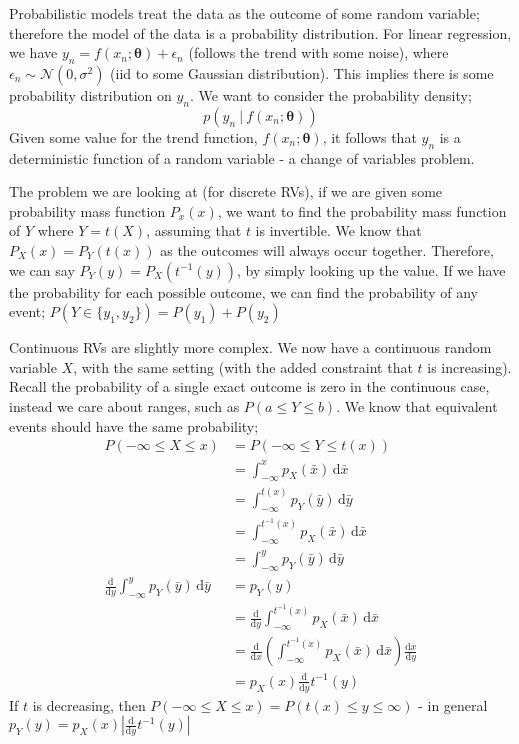 \documentclass[a4paper, 12pt]{article}
\newcommand{\defint}[4]{\int_{#1}^{#2} #3 \, \mathrm{d}#4}
\newcommand{\dif}[2]{\frac{\mathrm{d}#1}{\mathrm{d}#2}}
\renewcommand{\vec}[1]{\boldsymbol{#1}}
\begin{document}
            Probabilistic models treat the data as the outcome of some random variable; therefore the model of the data is a probability distribution.
            For linear regression, we have $y_n = f(x_n; \vec{\theta}) + \epsilon_n$ (follows the trend with some noise), where $\epsilon_n \sim \mathcal{N}(0, \sigma^2)$ (iid to some Gaussian distribution).
            This implies there is some probability distribution on $y_n$.
            We want to consider the probability density;
            $$p(y_n\ |\ f(x_n; \vec{\theta}))$$
            Given some value for the trend function, $f(x_n; \vec{\theta})$, it follows that $y_n$ is a deterministic function of a random variable - a change of variables problem.
            \medskip

            The problem we are looking at (for discrete RVs), if we are given some probability mass function $P_x(x)$, we want to find the probability mass function of $Y$ where $Y = t(X)$, assuming that $t$ is invertible.
            We know that $P_X(x) = P_Y(t(x))$ as the outcomes will always occur together.
            Therefore, we can say $P_Y(y) = P_X(t^{-1}(y))$, by simply looking up the value.
            If we have the probability for each possible outcome, we can find the probability of any event; $P(Y \in \{ y_1, y_2 \}) = P(y_1) + P(y_2)$
            \medskip

            Continuous RVs are slightly more complex.
            We now have a continuous random variable $X$, with the same setting (with the added constraint that $t$ is increasing).
            Recall the probability of a single exact outcome is zero in the continuous case, instead we care about ranges, such as $P(a \leq Y \leq b)$.
            We know that equivalent events should have the same probability;
            \begin{align*}
                P(-\infty \leq X \leq x) & = P(-\infty \leq Y \leq t(x)) \\
                & = \defint{-\infty}{x}{p_X(\bar{x})}{\bar{x}} \\
                & = \defint{-\infty}{t(x)}{p_Y(\bar{y})}{\bar{y}} \\
                & = \defint{-\infty}{t^{-1}(x)}{p_X(\bar{x})}{\bar{x}} \\
                & = \defint{-\infty}{y}{p_Y(\bar{y})}{\bar{y}} \\
                \dif{}{y} \defint{-\infty}{y}{p_Y(\bar{y})}{\bar{y}} & = p_Y(y) \\
                & = \dif{}{y} \defint{-\infty}{t^{-1}(x)}{p_X(\bar{x})}{\bar{x}} \\
                & = \dif{}{x} \left(\defint{-\infty}{t^{-1}(x)}{p_X(\bar{x})}{\bar{x}}\right) \dif{x}{y} \\
                & = p_X(x) \dif{}{y} t^{-1}(y)
            \end{align*}
            If $t$ is decreasing, then $P(-\infty \leq X \leq x) = P(t(x) \leq y \leq \infty)$ - in general $p_Y(y) = p_X(x) |\dif{}{y} t^{-1}(y)|$
            \medskip
\end{document}
